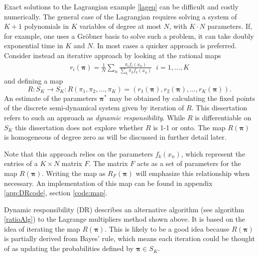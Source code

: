 Exact solutions to the Lagrangian example \ref{lageq} can be difficult and costly numerically.  The general case of the Lagrangian requires solving a system of $K+1$ polynomials in $K$ variables of degree at most $N$, with $K\cdot N$ parameters.  If, for example, one uses a Gr\"obner basis to solve such a problem, it can take doubly exponential time in $K$ and $N$.  In most cases a quicker approach is preferred. \\

Consider instead an iterative approach by looking at the rational maps
\begin{align*}
r_i(\bm\pi)=\frac 1N\sum_n \frac{\pi_i f_i(x_n)}{\sum_{k}\pi_{k}f_{k}(x_n)}\;\; i=1,\ldots,K
\end{align*}
and defining a map 
\begin{equation}\label{map}
R:S_K\rightarrow S_K: R(\pi_1,\pi_2,\ldots,\pi_K)=(r_1(\bm\pi),r_2(\bm\pi),\ldots,r_K(\bm\pi)).
\end{equation}
An estimate of the parameters \( \bm\pi^{\ast} \) may be obtained by calculating the fixed points of the discrete semi-dynamical system given by iteration of \( R \). This dissertation refers to such an approach as \textit{dynamic responsibility}. While \( R \) is differentiable on \( S_K \) this dissertation does not explore whether \( R \) is 1-1 or onto. The map $R(\bm\pi)$ is homogeneous of degree zero as will be discussed in further detail later.

Note that this approach relies on the parameters $f_k(x_n)$, which represent the entries of a $K\times N$ matrix $F$. The matrix $F$ acts as a set of parameters for the map $R(\bm\pi)$. Writing the map as $R_F(\bm\pi)$ will emphasize this relationship when necessary. An implementation of this map can be found in appendix \ref{app:DRcode}, section \ref{code:map}.

Dynamic responsibility (DR) describes an alternative algorithm (see algorithm \ref{ratioAlg}) to the Lagrange multipliers method shown above.  It is based on the idea of iterating the map $R(\bm\pi)$. This is likely to be a good idea because $R(\bm\pi)$ is partially derived from Bayes' rule, which means each iteration could be thought of as updating the probabilities defined by $\bm\pi\in S_K$.  

